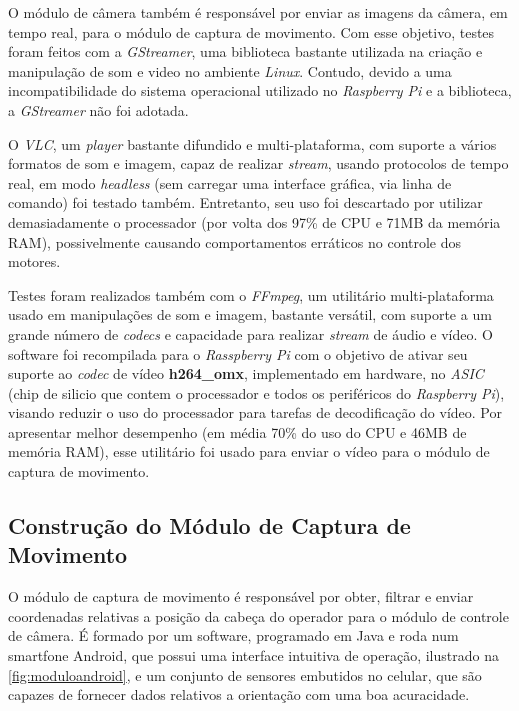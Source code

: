 O módulo de câmera também é responsável por enviar as imagens da câmera, em tempo real, para o módulo de captura de movimento. Com esse objetivo, testes foram feitos com a \textit{GStreamer}, uma biblioteca bastante utilizada na criação e manipulação de som e video no ambiente \textit{Linux}. Contudo, devido a uma incompatibilidade do sistema operacional utilizado no \textit{Raspberry Pi} e a biblioteca, a \textit{GStreamer} não foi adotada.\par

O \textit{VLC}, um \textit{player} bastante difundido e multi-plataforma, com suporte a vários formatos de som e imagem, capaz de realizar \textit{stream}, usando protocolos de tempo real, em modo \textit{headless} (sem carregar uma interface gráfica, via linha de comando) foi testado também. Entretanto, seu uso foi descartado por utilizar demasiadamente o processador (por volta dos 97\% de CPU e 71MB da memória RAM), possivelmente causando comportamentos erráticos no controle dos motores.\par

Testes foram realizados também com o \textit{FFmpeg}, um utilitário multi-plataforma usado em manipulações de som e imagem, bastante versátil, com suporte a um grande número de \textit{codecs} e capacidade para realizar \textit{stream} de áudio e vídeo. O software foi recompilada para o \textit{Rasspberry Pi} com o objetivo de ativar seu suporte ao \textit{codec} de vídeo \textbf{h264\_omx}, implementado em hardware, no \textit{ASIC} (chip de silicio que contem o processador e todos os periféricos do \textit{Raspberry Pi}), visando reduzir o uso do processador para tarefas de decodificação do vídeo. Por apresentar melhor desempenho (em média 70\% do uso do CPU e 46MB de memória RAM), esse utilitário foi usado para enviar o vídeo para o módulo de captura de movimento.



\subsection{Construção do Módulo de Captura de Movimento}
\label{subsec:assemmodcapmov}

O módulo de captura de movimento é responsável por obter, filtrar e enviar coordenadas relativas a posição da cabeça do operador para o módulo de controle de câmera. É formado por um software, programado em Java e roda num smartfone Android, que possui uma interface intuitiva de operação, ilustrado na \autoref{fig:moduloandroid}, e um conjunto de sensores embutidos no celular, que são capazes de fornecer dados relativos a orientação com uma boa acuracidade.

